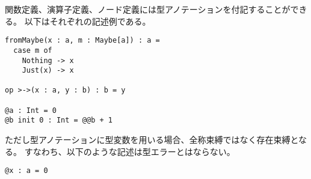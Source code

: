 関数定義、演算子定義、ノード定義には型アノテーションを付記することができる。
以下はそれぞれの記述例である。
\begin{lstlisting}[basicstyle=\ttfamily\small,language=SFRP]
fromMaybe(x : a, m : Maybe[a]) : a =
  case m of
    Nothing -> x
    Just(x) -> x

op >->(x : a, y : b) : b = y

@a : Int = 0
@b init 0 : Int = @@b + 1
\end{lstlisting}

ただし型アノテーションに型変数を用いる場合、全称束縛ではなく存在束縛となる。
すなわち、以下のような記述は型エラーとはならない。
\begin{lstlisting}[basicstyle=\ttfamily\small,language=SFRP]
@x : a = 0
\end{lstlisting}



